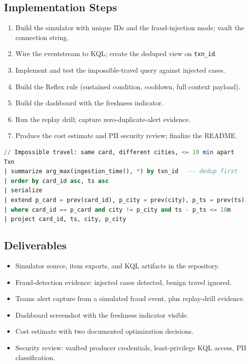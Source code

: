 \subsection*{Implementation Steps}
\begin{enumerate}
    \item Build the simulator with unique IDs and the fraud-injection mode; vault the connection string.
    \item Wire the eventstream to KQL; create the deduped view on \texttt{txn\_id}.
    \item Implement and test the impossible-travel query against injected cases.
    \item Build the Reflex rule (sustained condition, cooldown, full context payload).
    \item Build the dashboard with the freshness indicator.
    \item Run the replay drill; capture zero-duplicate-alert evidence.
    \item Produce the cost estimate and PII security review; finalize the README.
\end{enumerate}

\begin{lstlisting}[language=SQL,caption={Milestone 4: impossible travel over the deduplicated stream.},label={lst:chapter16-capstone-fraud}]
// Impossible travel: same card, different cities, <= 10 min apart
Txn
| summarize arg_max(ingestion_time(), *) by txn_id   -- dedup first
| order by card_id asc, ts asc
| serialize
| extend p_card = prev(card_id), p_city = prev(city), p_ts = prev(ts)
| where card_id == p_card and city != p_city and ts - p_ts <= 10m
| project card_id, ts, city, p_city
\end{lstlisting}

\subsection*{Deliverables}
\begin{itemize}
    \item Simulator source, item exports, and KQL artifacts in the repository.
    \item Fraud-detection evidence: injected cases detected, benign travel ignored.
    \item Teams alert capture from a simulated fraud event, plus replay-drill evidence.
    \item Dashboard screenshot with the freshness indicator visible.
    \item Cost estimate with two documented optimization decisions.
    \item Security review: vaulted producer credentials, least-privilege KQL access, PII classification.
\end{itemize}

